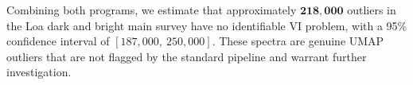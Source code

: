 Combining both programs, we estimate that approximately
$\mathbf{218{,}000}$ outliers in the Loa dark and bright main survey
have no identifiable VI problem, with a 95\% confidence interval of
$[187{,}000,\ 250{,}000]$.
These spectra are genuine UMAP outliers that are not flagged by the
standard pipeline and warrant further investigation.

